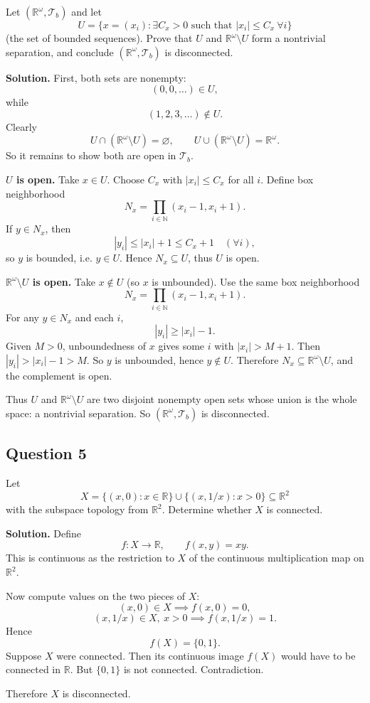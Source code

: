 \documentclass{article}
\newcommand{\R}{\mathbb{R}}
\newcommand{\N}{\mathbb{N}}
\newenvironment{solution}{\par\noindent\textbf{Solution.}\quad}{\par}
\begin{document}
Let $(\R^\omega,\mathcal{T}_b)$ and let
\[
  U=\{x=(x_i): \exists C_x>0\text{ such that }|x_i|\le C_x\ \forall i\}
\]
(the set of bounded sequences).
Prove that $U$ and $\R^\omega\setminus U$ form a nontrivial
separation, and conclude $(\R^\omega,\mathcal{T}_b)$ is disconnected.

\begin{solution}
  First, both sets are nonempty:
  \[
    (0,0,\dots)\in U,
  \]
  while
  \[
    (1,2,3,\dots)\notin U.
  \]
  Clearly
  \[
    U\cap(\R^\omega\setminus U)=\varnothing,
    \qquad
    U\cup(\R^\omega\setminus U)=\R^\omega.
  \]
  So it remains to show both are open in $\mathcal{T}_b$.

  \textbf{$U$ is open.}
  Take $x\in U$. Choose $C_x$ with $|x_i|\le C_x$ for all $i$.
  Define box neighborhood
  \[
    N_x=\prod_{i\in\N}(x_i-1,x_i+1).
  \]
  If $y\in N_x$, then
  \[
    |y_i|\le |x_i|+1\le C_x+1\quad(\forall i),
  \]
  so $y$ is bounded, i.e. $y\in U$.
  Hence $N_x\subseteq U$, thus $U$ is open.

  \textbf{$\R^\omega\setminus U$ is open.}
  Take $x\notin U$ (so $x$ is unbounded).
  Use the same box neighborhood
  \[
    N_x=\prod_{i\in\N}(x_i-1,x_i+1).
  \]
  For any $y\in N_x$ and each $i$,
  \[
    |y_i|\ge |x_i|-1.
  \]
  Given $M>0$, unboundedness of $x$ gives some $i$ with $|x_i|>M+1$.
  Then $|y_i|>|x_i|-1>M$.
  So $y$ is unbounded, hence $y\notin U$.
  Therefore $N_x\subseteq \R^\omega\setminus U$, and the complement is open.

  Thus $U$ and $\R^\omega\setminus U$ are two disjoint nonempty open
  sets whose union is the whole space: a nontrivial separation.
  So $(\R^\omega,\mathcal{T}_b)$ is disconnected.
\end{solution}

\subsection{Question 5}

Let
\[
  X=\{(x,0):x\in\R\}\cup\{(x,1/x):x>0\}\subseteq\R^2
\]
with the subspace topology from $\R^2$. Determine whether $X$ is connected.

\begin{solution}
  Define
  \[
    f:X\to\R,\qquad f(x,y)=xy.
  \]
  This is continuous as the restriction to $X$ of the continuous
  multiplication map on $\R^2$.

  Now compute values on the two pieces of $X$:
  \[
    (x,0)\in X \implies f(x,0)=0,
  \]
  \[
    (x,1/x)\in X,\ x>0 \implies f(x,1/x)=1.
  \]
  Hence
  \[
    f(X)=\{0,1\}.
  \]
  Suppose $X$ were connected. Then its continuous image $f(X)$ would
  have to be connected in $\R$.
  But $\{0,1\}$ is not connected.
  Contradiction.

  Therefore $X$ is disconnected.
\end{solution}
\end{document}
